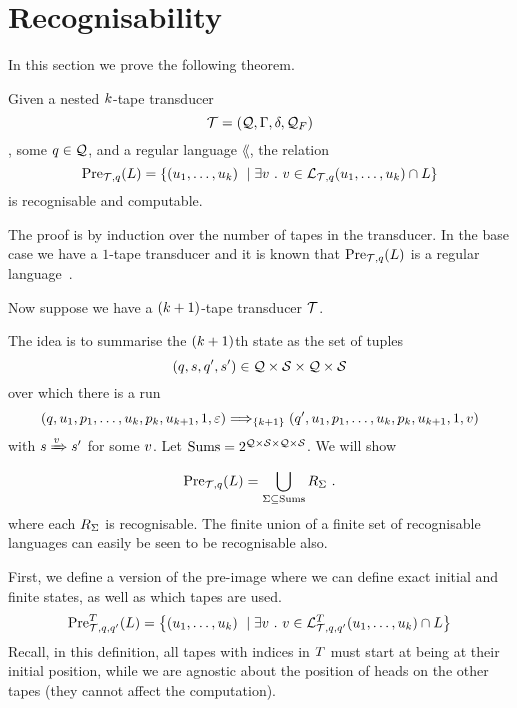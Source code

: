 
\section{Recognisability}

In this section we prove the following theorem.

\begin{theorem}
    Given a nested $k$-tape transducer
    $$\mathcal{T} = \left(\mathcal{Q}, \Gamma, \delta, \mathcal{Q}_F\right)$$,
    some
    $q \in \mathcal{Q}$,
    and a regular language $\lang$, the relation
    \[
        \preimage{\ducer}{\tstate}{\lang} =
        \setcomp{
            \tup{\iword_1, \ldots, \iword_\numtapes}
        }{
            \exists \oword\ .\ %
                \oword \in
                    \tlangof{\ducer}
                            {\tstate}
                            {\iword_1, \ldots, \iword_\numtapes}
                    \cap
                    \lang
        }
    \]
    is recognisable and computable.
\end{theorem}

The proof is by induction over the number of tapes in the transducer.
In the base case we have a $1$-tape transducer and it is known that
${\text{Pre}_{\mathcal{T},q}}\mathord{\left(L\right)}$
is a regular language~\cite{??}.

Now suppose we have a $(k+1)$-tape transducer $\mathcal{T}$.


The idea is to summarise the $(k+1)$th state as the set of tuples
\[
    \left(q, s, q', s'\right)
    \in
    \mathcal{Q} \times \mathcal{S} \times \mathcal{Q} \times \mathcal{S}
\]
over which there is a run
\[
    \left(
        q,
        u_1, p_1,
        \ldots,
        u_k, p_k,
        u_{k+1}, 1,
        \varepsilon
    \right)
    \Longrightarrow_{\left\{k+1\right\}}
    \left(
        q',
        u_1, p_1,
        \ldots,
        u_k, p_k,
        u_{k+1}, 1,
        v
    \right)
\]
with
$s \xRightarrow{v} s'$
for some $v$.
Let
$\text{Sums} = 2^{\mathcal{Q} \times \mathcal{S} \times \mathcal{Q} \times \mathcal{S}}$.
We will show
\[
    {\text{Pre}_{\mathcal{T},q}}\mathord{\left(L\right)} =
        \bigcup\limits_{\Sigma \subseteq \text{Sums}}
            R_\Sigma \ .
\]
where each $R_\Sigma$ is recognisable.
The finite union of a finite set of recognisable languages can easily be seen to be recognisable also.

First, we define a version of the pre-image where we can define exact initial and finite states, as well as which tapes are used.
\[
    \preimageidx{\ducer}{\tstate}{\tstate'}{\tidxs}{\lang} =
    \setcomp{
        \tup{\iword_1, \ldots, \iword_\numtapes}
    }{
        \exists \oword\ .\ %
            \oword \in
                \tlangofidx{\ducer}
                           {\tstate}
                           {\tstate'}
                           {\tidxs}
                           {\iword_1, \ldots, \iword_\numtapes}
                \cap
                \lang
    }
\]
Recall, in this definition, all tapes with indices in $T$ must start at being at their initial position, while we are agnostic about the position of heads on the other tapes (they cannot affect the computation).

